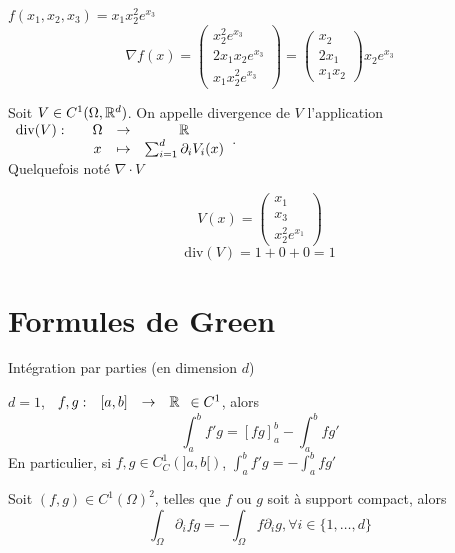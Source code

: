 \documentclass[]{report}
\begin{document}
    \begin{ex}{}{}
        $f(x_1,x_2,x_3)=x_1x_2^2e^{x_3}$
        \[\nabla f(x)=\left(\begin{matrix}
            x_2^2 e^{x_3}\\
            2x_1x_2 e^{x_3}\\
            x_1 x_2^2 e^{x_3}
        \end{matrix}\right)=\left( \begin{matrix}
            x_2\\
            2x_1\\
            x_1x_2
        \end{matrix}\right) x_2 e^{x_3}\]
    \end{ex}

    \begin{df}{}{}
        Soit $V\in C^1(\Omega,\mathbb{R}^d)$. On appelle divergence de $V$ l'application $\begin{array}{ccccc} \text{div} (V) : & & \Omega & \to & \mathbb{R} \\ & & x & \mapsto & \sum_{i=1}^{d}\partial_i V_i(x) \end{array}$.\\
        Quelquefois noté $\nabla\cdot V$
    \end{df}

    \begin{ex}{}{}
        \[V(x)=\left(\begin{matrix}
            x_1\\
            x_3\\
            x_2^2 e^{x_1}
        \end{matrix}\right)\]
        \[\text{div}(V)=1+0+0=1\]
    \end{ex}

    \section{Formules de Green}

    Intégration par parties (en dimension $d$)

    \begin{ra}{}{}
        $d=1$, $\begin{array}{ccccc} f,g : & [a,b] & \to & \mathbb{R} \end{array}\in C^1$, alors
        \[\int_{a}^{b}f'g=\left[fg\right]_a^b-\int_{a}^{b} fg'\]
        En particulier, si $f,g\in C^1_C(]a,b[)$, $\int_{a}^{b} f'g=-\int_{a}^{b}fg'$
    \end{ra}

    \begin{prop}{}{}
        Soit $(f,g)\in C^1(\Omega)^2$, telles que $f$ ou $g$ soit à support compact, alors
        \[\int_{\Omega}\partial_i fg=-\int_{\Omega} f\partial_i g,\forall i\in \{1,\ldots,d\}\]
    \end{prop}
\end{document}
